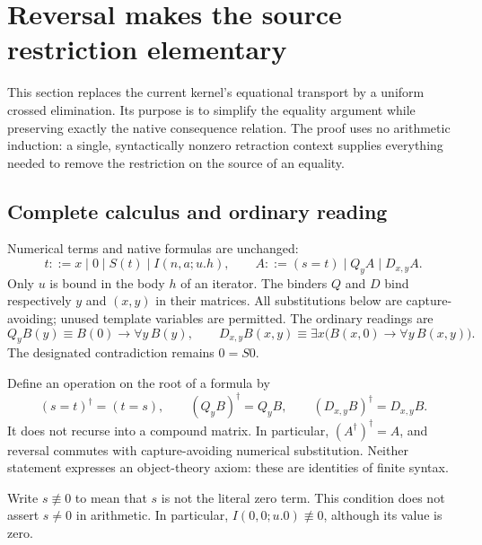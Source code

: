 
\section{Reversal makes the source restriction elementary}
\label{rev:section}

This section replaces the current kernel's equational transport by a
uniform crossed elimination. Its purpose is to simplify the equality
argument while preserving exactly the native consequence relation. The
proof uses no arithmetic induction: a single, syntactically nonzero
retraction context supplies everything needed to remove the restriction
on the source of an equality.

\subsection{Complete calculus and ordinary reading}

Numerical terms and native formulas are unchanged:
\[
 t::=x\mid0\mid S(t)\mid I(n,a;u.h),
 \qquad
 A::=(s=t)\mid Q_yA\mid D_{x,y}A.
\]
Only $u$ is bound in the body $h$ of an iterator. The binders $Q$ and $D$
bind respectively $y$ and $(x,y)$ in their matrices. All substitutions
below are capture-avoiding; unused template variables are permitted.
The ordinary readings are
\[
 Q_yB(y)\equiv B(0)\to\forall y\,B(y),\qquad
 D_{x,y}B(x,y)\equiv
 \exists x\bigl(B(x,0)\to\forall y\,B(x,y)\bigr).
\]
The designated contradiction remains $0=S0$.

Define an operation on the root of a formula by
\[
 (s=t)^\dagger=(t=s),\qquad
 (Q_yB)^\dagger=Q_yB,\qquad
 (D_{x,y}B)^\dagger=D_{x,y}B.
 \tag{Reversal}\label{rev:rho}
\]
It does not recurse into a compound matrix. In particular,
$(A^\dagger)^\dagger=A$, and reversal commutes with capture-avoiding
numerical substitution. Neither statement expresses an object-theory
axiom: these are identities of finite syntax.

Write $s\not\equiv0$ to mean that $s$ is not the literal zero term.
This condition does not assert $s\ne0$ in arithmetic. In particular,
$I(0,0;u.0)\not\equiv0$, although its value is zero.

